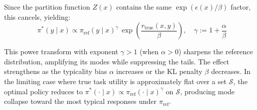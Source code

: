 Since the partition function $Z(x)$ contains the same $\exp(\epsilon(x)/\beta)$ factor, this cancels, yielding:
\begin{equation}
\pi^*(y\mid x) \propto \pi_{\mathrm{ref}}(y\mid x)^{\gamma}\,\exp\!\left(\frac{r_{\text{true}}(x,y)}{\beta}\right), \quad \gamma := 1 + \frac{\alpha}{\beta}
\label{eq:power-result}
\end{equation}

This power transform with exponent $\gamma > 1$ (when $\alpha > 0$) sharpens the reference distribution, amplifying its modes while suppressing the tails. The effect strengthens as the typicality bias $\alpha$ increases or the KL penalty $\beta$ decreases. In the limiting case where true task utility is approximately flat over a set $\mathcal{S}$, the optimal policy reduces to $\pi^*(\cdot \mid x) \propto \pi_{\mathrm{ref}}(\cdot \mid x)^{\gamma}$ on $\mathcal{S}$, producing mode collapse toward the most typical responses under $\pi_{\mathrm{ref}}$.












